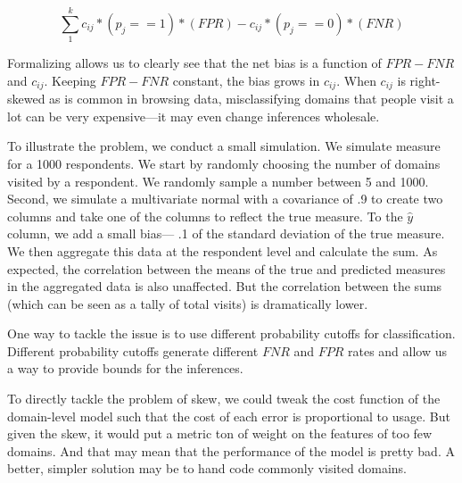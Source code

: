 \documentclass[12pt, letterpaper]{article}
\begin{document}
$$
\sum_{1}^{k} c_{ij} *\left(p_{j}==1\right) *(FPR)-c_{ij} *\left(p_{j}==0\right) *(FNR)
$$

Formalizing allows us to clearly see that the net bias is a function of $FPR-FNR$ and $c_{ij}$. Keeping $FPR-FNR$ constant, the bias grows in $c_{ij}$. When $c_{ij}$ is right-skewed as is common in browsing data, misclassifying domains that people visit a lot can be very expensive---it may even change inferences wholesale.

To illustrate the problem, we conduct a small simulation. We simulate measure for a 1000 respondents. We start by randomly choosing the number of domains visited by a respondent. We randomly sample a number between 5 and 1000. Second, we simulate a multivariate normal with a covariance of .9 to create two columns and take one of the columns to reflect the true measure. To the $\hat{y}$ column, we add a small bias--- .1 of the standard deviation of the true measure. We then aggregate this data at the respondent level and calculate the sum. As expected, the correlation between the means of the true and predicted measures in the aggregated data is also unaffected. But the correlation between the sums (which can be seen as a tally of total visits) is dramatically lower.

One way to tackle the issue is to use different probability cutoffs for classification. Different probability cutoffs generate different $FNR$ and $FPR$ rates and allow us a way to provide bounds for the inferences.

To directly tackle the problem of skew, we could tweak the cost function of the domain-level model such that the cost of each error is proportional to usage. But given the skew, it would put a metric ton of weight on the features of too few domains. And that may mean that the performance of the model is pretty bad. A better, simpler solution may be to hand code commonly visited domains.

\clearpage


\end{document}
